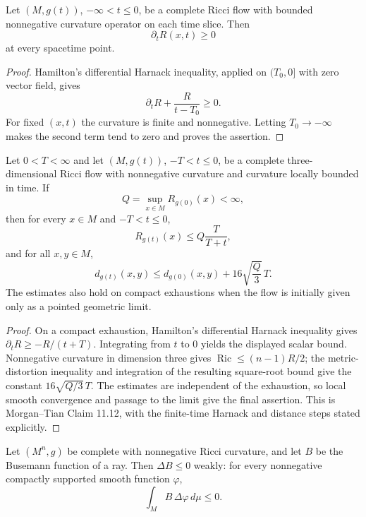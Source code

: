\begin{theorem}
\label{thm:ancient-scalar-curvature-monotonicity}
\notready
Let $(M,g(t))$, $-\infty<t\le0$, be a complete Ricci flow with bounded
nonnegative curvature operator on each time slice.  Then
\[
 \partial_tR(x,t)\ge0
\]
at every spacetime point.
\end{theorem}

\begin{proof}
Hamilton's differential Harnack inequality, applied on $(T_0,0]$ with zero
vector field, gives
\[
 \partial_tR+\frac{R}{t-T_0}\ge0.
\]
For fixed $(x,t)$ the curvature is finite and nonnegative.  Letting
$T_0\to-\infty$ makes the second term tend to zero and proves the assertion.
\end{proof}

\begin{lemma}
\label{lem:finite-interval-harnack-distance-control}
\notready
Let $0<T<\infty$ and let $(M,g(t))$, $-T<t\le0$, be a complete
three-dimensional Ricci flow with nonnegative curvature and curvature locally
bounded in time.  If
\[
 Q=\sup_{x\in M}R_{g(0)}(x)<\infty,
\]
then for every $x\in M$ and $-T<t\le0$,
\[
 R_{g(t)}(x)\le Q\frac{T}{T+t},
\]
and for all $x,y\in M$,
\[
 d_{g(t)}(x,y)\le d_{g(0)}(x,y)+16\sqrt{\frac Q3}\,T.
\]
The estimates also hold on compact exhaustions when the flow is initially
given only as a pointed geometric limit.
\end{lemma}

\begin{proof}
On a compact exhaustion, Hamilton's differential Harnack inequality gives
\(\partial_tR\ge-R/(t+T)\).  Integrating from $t$ to $0$ yields the
displayed scalar bound.  Nonnegative curvature in dimension three gives
\(\operatorname{Ric}\le (n-1)R/2\); the metric-distortion inequality and
integration of the resulting square-root bound give the constant
\(16\sqrt{Q/3}\,T\).  The estimates are independent of the exhaustion, so
local smooth convergence and passage to the limit give the final assertion.
This is Morgan--Tian Claim 11.12, with the finite-time Harnack and distance
steps stated explicitly.
\end{proof}

\begin{theorem}
\label{thm:busemann-function-superharmonicity}
\notready
Let $(M^n,g)$ be complete with nonnegative Ricci curvature, and let $B$ be
the Busemann function of a ray.  Then $\Delta B\le0$ weakly: for every
nonnegative compactly supported smooth function $\varphi$,
\[
 \int_M B\,\Delta\varphi\,d\mu\le0.
\]
\end{theorem}

